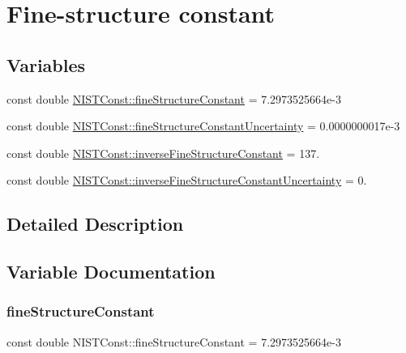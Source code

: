 \hypertarget{group___fine_structure_constant}{}\section{Fine-\/structure constant}
\label{group___fine_structure_constant}
\subsection*{Variables}
\begin{DoxyCompactItemize}
\item 
const double \hyperlink{group___fine_structure_constant_ga0f1ddaca2627b7253ed177aa1b074724}{N\+I\+S\+T\+Const\+::fine\+Structure\+Constant} = 7.\+2973525664e-\/3
\item 
const double \hyperlink{group___fine_structure_constant_ga18067d14fb16cc6418212812405e6496}{N\+I\+S\+T\+Const\+::fine\+Structure\+Constant\+Uncertainty} = 0.\+0000000017e-\/3
\item 
const double \hyperlink{group___fine_structure_constant_gaa4cd257f5376577cf0331e71dd952bb6}{N\+I\+S\+T\+Const\+::inverse\+Fine\+Structure\+Constant} = 137.
\item 
const double \hyperlink{group___fine_structure_constant_gae26a4808ef23039e47ea7fc6d971d420}{N\+I\+S\+T\+Const\+::inverse\+Fine\+Structure\+Constant\+Uncertainty} = 0.
\end{DoxyCompactItemize}


\subsection{Detailed Description}


\subsection{Variable Documentation}
\mbox{\label{group___fine_structure_constant_ga0f1ddaca2627b7253ed177aa1b074724}} 
\subsubsection{\texorpdfstring{fine\+Structure\+Constant}{fineStructureConstant}}
{\footnotesize\ttfamily const double N\+I\+S\+T\+Const\+::fine\+Structure\+Constant = 7.\+2973525664e-\/3}

